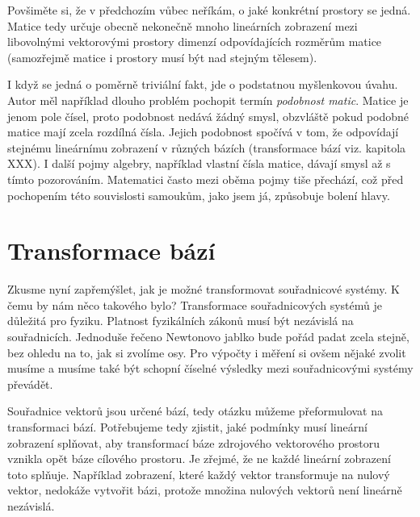 \documentclass[a5paper,12pt]{amsbook}
\theoremstyle{definition}
\begin{document}
Povšiměte si, že v předchozím vůbec neříkám, o jaké konkrétní prostory se jedná. Matice tedy
určuje obecně nekonečně mnoho lineárních zobrazení mezi libovolnými vektorovými prostory dimenzí
odpovídajících rozměrům matice (samozřejmě matice i prostory musí být nad stejným tělesem).

I když se jedná o poměrně triviální fakt, jde o podstatnou myšlenkovou úvahu.
Autor měl například dlouho problém pochopit termín \textit{podobnost matic}. Matice je jenom
pole čísel, proto podobnost nedává žádný smysl, obzvláště pokud podobné matice mají zcela
rozdílná čísla. Jejich podobnost spočívá v tom, že odpovídají stejnému lineárnímu zobrazení
v různých bázích (transformace bází viz. kapitola XXX). I další pojmy algebry, například vlastní
čísla matice, dávají smysl až s tímto pozorováním. Matematici často mezi oběma pojmy tiše přechází,
což před pochopením této souvislosti samoukům, jako jsem já, způsobuje bolení hlavy.

\section{Transformace bází}

\noindent Zkusme nyní zapřemýšlet, jak je možné transformovat souřadnicové systémy.  K čemu by nám
něco takového bylo? Transformace souřadnicových systémů je důležitá pro fyziku. Platnost
fyzikálních zákonů musí být nezávislá na souřadnicích. Jednoduše řečeno Newtonovo jablko bude
pořád padat zcela stejně, bez ohledu na to, jak si zvolíme osy. Pro výpočty i měření si ovšem
nějaké zvolit musíme a musíme také být schopní číselné výsledky mezi souřadnicovými systémy
převádět.

Souřadnice vektorů jsou určené bází, tedy otázku můžeme přeformulovat na transformaci bází.
Potřebujeme tedy zjistit, jaké podmínky musí lineární zobrazení splňovat, aby transformací
báze zdrojového vektorového prostoru vznikla opět báze cílového prostoru. Je zřejmé, že ne každé
lineární zobrazení toto splňuje. Například zobrazení, které každý vektor transformuje na nulový
vektor, nedokáže vytvořit bázi, protože množina nulových vektorů není lineárně nezávislá.
\end{document}
